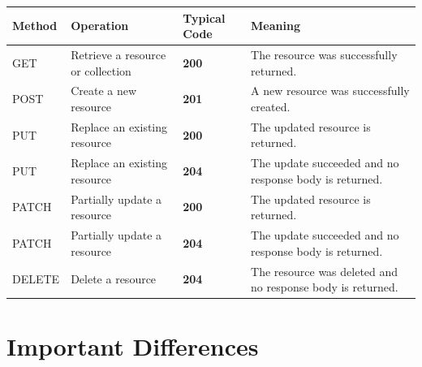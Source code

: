\documentclass[a4paper]{article}
\begin{document}
        \begin{center}
            \begin{longtable}{
                    >{\ttfamily}p{2cm}
                p{4cm}
                    >{\ttfamily\bfseries}p{2cm}
                p{6cm}
            }
                \toprule
                \textnormal{\textbf{Method}} &
                \textbf{Operation} &
                \textnormal{\textbf{Typical Code}} &
                \textbf{Meaning} \\
                \midrule
                GET &
                Retrieve a resource or collection &
                200 &
                The resource was successfully returned. \\
                
                POST &
                Create a new resource &
                201 &
                A new resource was successfully created. \\
                
                PUT &
                Replace an existing resource &
                200 &
                The updated resource is returned. \\
                
                PUT &
                Replace an existing resource &
                204 &
                The update succeeded and no response body is returned. \\
                
                PATCH &
                Partially update a resource &
                200 &
                The updated resource is returned. \\
                
                PATCH &
                Partially update a resource &
                204 &
                The update succeeded and no response body is returned. \\
                
                DELETE &
                Delete a resource &
                204 &
                The resource was deleted and no response body is returned. \\
                \bottomrule
            \end{longtable}
        \end{center}
    
    
    \section{Important Differences}
        
\end{document}
